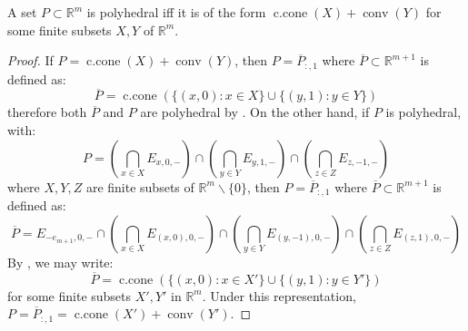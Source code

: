 \begin{prop}\label{prop:017-Minkowski-Weyl-Representation}
	A set $P\subset \mathbb{R}^m$ is polyhedral iff it is of the form $\operatorname{c.cone}(X)+\operatorname{conv}(Y)$ for some finite subsets $X,Y$ of $\mathbb{R}^m$.
\end{prop}
\begin{proof}
	If $P=\operatorname{c.cone}(X)+\operatorname{conv}(Y)$, then $P=\overline{P}_{:,1}$ where $\overline{P}\subset \mathbb{R}^{m+1}$ is defined as:
	\[
		\overline{P}=\operatorname{c.cone}\left(\{(x,0):x\in X\}\cup\{(y,1):y\in Y\}\right)
	\]
	therefore both $\overline{P}$ and $P$ are polyhedral by . On the other hand, if $P$ is polyhedral, with:
	\[
		P=\left(\bigcap_{x\in X} E_{x,0,-}\right)\cap\left(\bigcap_{y\in Y} E_{y,1,-}\right)\cap \left(\bigcap_{z\in Z} E_{z,-1,-}\right)
	\]
	where $X,Y,Z$ are finite subsets of $\mathbb{R}^m\smallsetminus\{0\}$, then $P=\overline{P}_{:,1}$ where $\overline{P}\subset \mathbb{R}^{m+1}$ is defined as:
	\[
		\overline{P}=E_{-e_{m+1},0,-}\cap\left(\bigcap_{x\in X} E_{(x,0),0,-}\right)\cap\left(\bigcap_{y\in Y} E_{(y,-1),0,-}\right)\cap \left(\bigcap_{z\in Z} E_{(z,1),0,-}\right)
	\]
	By , we may write:
	\[
		\overline{P}=\operatorname{c.cone}\left(\{(x,0):x\in X'\}\cup \{(y, 1):y\in Y'\}\right)
	\]
	for some finite subsets $X',Y'$ in $\mathbb{R}^m$. Under this representation, $P=\overline{P}_{:,1}=\operatorname{c.cone}(X')+\operatorname{conv}(Y')$.
\end{proof}

